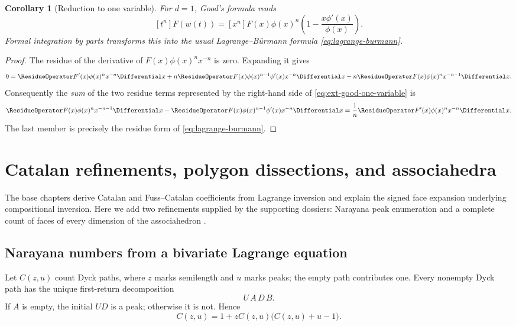 \documentclass[11pt,a4paper,oneside,openany]{book}
\newtheorem{corollary}[theorem]{Corollary}
\theoremstyle{definition}
\theoremstyle{remark}
\begin{document}
\begin{corollary}[Reduction to one variable]
For \(d=1\), Good's formula reads
\begin{equation}\label{eq:ext-good-one-variable}
 [t^n]F(w(t))=[x^n]F(x)\phi(x)^n
 \left(1-\frac{x\phi'(x)}{\phi(x)}\right).
\end{equation}
Formal integration by parts transforms this into the usual
Lagrange--B\"urmann formula \eqref{eq:lagrange-burmann}.
\end{corollary}
\begin{proof}
The residue of the derivative of
\(F(x)\phi(x)^nx^{-n}\) is zero.  Expanding it gives
\[
 0=\ResidueOperator F'(x)\phi(x)^nx^{-n}\Differential x
   +n\ResidueOperator F(x)\phi(x)^{n-1}\phi'(x)x^{-n}\Differential x
   -n\ResidueOperator F(x)\phi(x)^nx^{-n-1}\Differential x.
\]
Consequently the \emph{sum} of the two residue terms represented by the
right-hand side of \eqref{eq:ext-good-one-variable} is
\[
 \ResidueOperator F(x)\phi(x)^nx^{-n-1}\Differential x
 -\ResidueOperator F(x)\phi(x)^{n-1}\phi'(x)x^{-n}\Differential x
 =\frac1n\ResidueOperator F'(x)\phi(x)^nx^{-n}\Differential x.
\]
The last member is precisely the residue form of
\eqref{eq:lagrange-burmann}.
\end{proof}

\chapter{Catalan refinements, polygon dissections, and associahedra}
\label{ch:ext-associahedra}

The base chapters derive Catalan and Fuss--Catalan coefficients from Lagrange
inversion and explain the signed face expansion underlying compositional
inversion.  Here we add two refinements supplied by the supporting dossiers:
Narayana peak enumeration and a complete count of faces of every dimension of
the associahedron \cite{Stasheff1963,Loday2004}.

\section{Narayana numbers from a bivariate Lagrange equation}

Let \(C(z,u)\) count Dyck paths, where \(z\) marks semilength and \(u\) marks
peaks; the empty path contributes one.  Every nonempty Dyck path has the unique
first-return decomposition
\[
 U\,A\,D\,B.
\]
If \(A\) is empty, the initial \(UD\) is a peak; otherwise it is not.  Hence
\begin{equation}\label{eq:ext-narayana-functional}
 C(z,u)=1+zC(z,u)\bigl(C(z,u)+u-1\bigr).
\end{equation}
\end{document}
